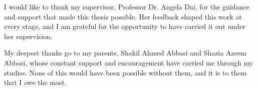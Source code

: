 \begin{thesisacknowledgments}

I would like to thank my supervisor, Professor Dr. Angela Dai, for the guidance and support that made this thesis possible. Her feedback shaped this work at every stage, and I am grateful for the opportunity to have carried it out under her supervision.

My deepest thanks go to my parents, Shakil Ahmed Abbasi and Shazia Azeem Abbasi, whose constant support and encouragement have carried me through my studies. None of this would have been possible without them, and it is to them that I owe the most.

\end{thesisacknowledgments}
